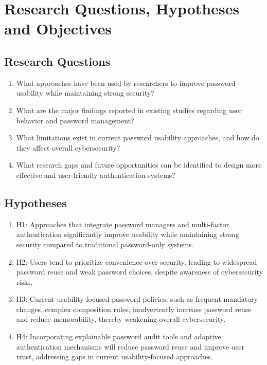 \documentclass[a4paper, 12pt]{article}
\begin{document}
\section{Research Questions, Hypotheses and Objectives}
\subsection*{Research Questions}
\begin{enumerate}
	\item What approaches have been used by researchers to improve password usability while maintaining strong security?

    \item What are the major findings reported in existing studies regarding user behavior and password management?

    \item What limitations exist in current password usability approaches, and how do they affect overall cybersecurity?

    \item What research gaps and future opportunities can be identified to design more effective and user-friendly authentication systems?
\end{enumerate}

\subsection*{Hypotheses}
\begin{enumerate}
	\item H1: Approaches that integrate password managers and multi-factor authentication significantly improve usability while maintaining strong security compared to traditional password-only systems.
 
    \item H2: Users tend to prioritize convenience over security, leading to widespread password reuse and weak password choices, despite awareness of cybersecurity risks.

    \item H3: Current usability-focused password policies, such as frequent mandatory changes, complex composition rules, inadvertently increase password reuse and reduce memorability, thereby weakening overall cybersecurity.
    
    \item H4: Incorporating explainable password audit tools and adaptive authentication mechanisms will reduce password reuse and improve user trust, addressing gaps in current usability-focused approaches.

\end{enumerate}
\end{document}

